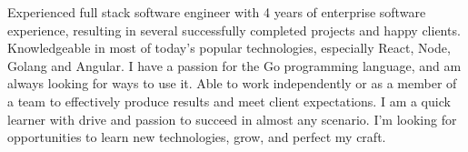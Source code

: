 

\begin{cvparagraph}

Experienced full stack software engineer with 4 years of enterprise software experience, resulting in several successfully completed projects and happy clients. Knowledgeable in most of today's popular technologies, especially React, Node, Golang and Angular. I have a passion for the Go programming language, and am always looking for ways to use it. Able to work independently or as a member of a team to effectively produce results and meet client expectations. I am a quick learner with drive and passion to succeed in almost any scenario. I’m looking for opportunities to learn new technologies, grow, and perfect my craft.
\end{cvparagraph}
